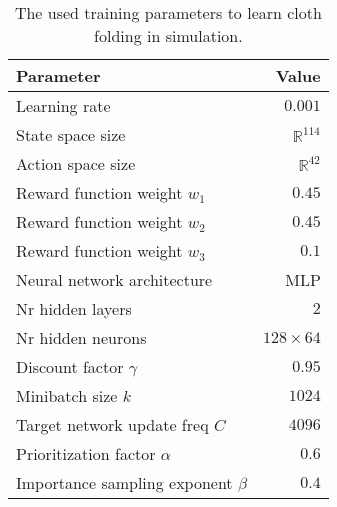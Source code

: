 \documentclass[\home/main.tex]{subfiles}
\begin{document}
\begin{table}[htb]
  \centering
  \begin{threeparttable}
    \caption{The used training parameters to learn cloth folding in simulation.}
    \begin{tabular}[t]{@{} l r @{}}
      \toprule
      Parameter                            & Value              \\
      \midrule

      Learning rate                        & $0.001$               \\
      State space size                     & $\mathbb{R}^{114}$ \\
      Action space size                    & $\mathbb{R}^{42}$  \\
      Reward function weight $w_1$         & $0.45$             \\
      Reward function weight $w_2$         & $0.45$             \\
      Reward function weight $w_3$         & $0.1$             \\
      Neural network architecture          & MLP             \\
      Nr hidden layers                     & $2$             \\
      Nr hidden neurons                    & $128 \times 64$             \\
      Discount factor $\gamma$             & $0.95$             \\
      Minibatch size $k$                   & $1024$             \\
      Target network update freq $C$       & $4096$             \\
      Prioritization factor $\alpha$       & $0.6$             \\
      Importance sampling exponent $\beta$ & $0.4$             \\

      \bottomrule
    \end{tabular}
    \label{table:training_sim_params}
  \end{threeparttable}
\end{table}
\end{document}
